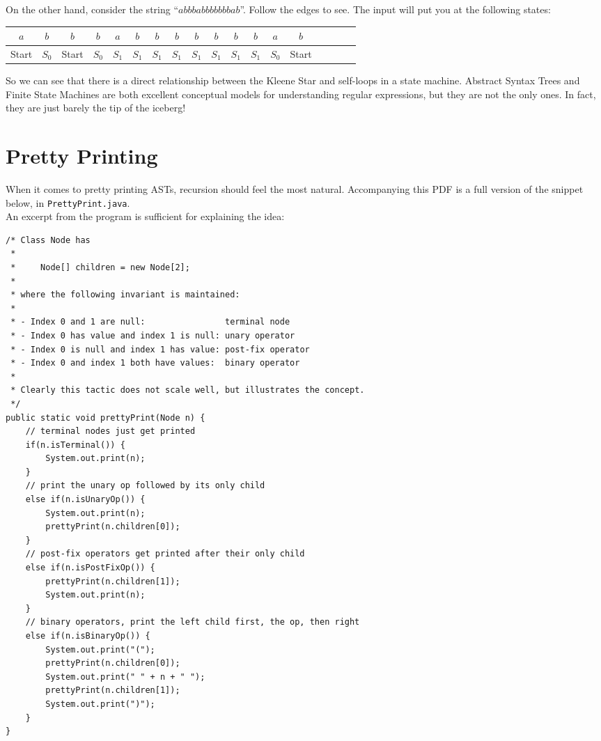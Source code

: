 \documentclass[12pt, leqno]{article} %
\begin{document}
\noindent On the other hand, consider the string ``$abbbabbbbbbbab$''.  Follow the edges to see.  The input will put you at the following states:
\begin{center}
  \begin{tabular}{|c|c|c|c|c|c|c|c|c|c|c|c|c|c|c|c|c|c|}
    \hline
    $a$ & $b$ & $b$ & $b$ & $a$ & $b$ & $b$ & $b$ & $b$ & $b$ & $b$ & $b$ & $a$ & $b$ \\ \hline
    Start & $S_0$ & Start & $S_0$ & $S_1$ & $S_1$ & $S_1$ & $S_1$ & $S_1$ & $S_1$ & $S_1$ & $S_1$ & $S_0$ & Start\\ \hline
  \end{tabular}
\end{center}
So we can see that there is a direct relationship between the Kleene Star and self-loops in a state machine.  Abstract Syntax Trees and Finite State Machines are both excellent conceptual models for understanding regular expressions, but they are not the only ones.  In fact, they are just barely the tip of the iceberg!
%
%
\section{Pretty Printing}
\label{sec:pretty_printing}
When it comes to pretty printing ASTs, recursion should feel the most natural.  Accompanying this PDF is a full version of the snippet below, in \texttt{PrettyPrint.java}.\\

\noindent An excerpt from the program is sufficient for explaining the idea:
\begin{small}
\begin{verbatim}
/* Class Node has
 * 
 *     Node[] children = new Node[2];
 *
 * where the following invariant is maintained:
 *
 * - Index 0 and 1 are null:                terminal node
 * - Index 0 has value and index 1 is null: unary operator
 * - Index 0 is null and index 1 has value: post-fix operator
 * - Index 0 and index 1 both have values:  binary operator
 *
 * Clearly this tactic does not scale well, but illustrates the concept.
 */
public static void prettyPrint(Node n) {
    // terminal nodes just get printed
    if(n.isTerminal()) {
        System.out.print(n);
    }
    // print the unary op followed by its only child
    else if(n.isUnaryOp()) {
        System.out.print(n);
        prettyPrint(n.children[0]);
    }
    // post-fix operators get printed after their only child
    else if(n.isPostFixOp()) {
        prettyPrint(n.children[1]);
        System.out.print(n);
    }
    // binary operators, print the left child first, the op, then right
    else if(n.isBinaryOp()) {
        System.out.print("(");
        prettyPrint(n.children[0]);
        System.out.print(" " + n + " ");
        prettyPrint(n.children[1]);
        System.out.print(")");
    }
}
\end{verbatim}
\end{small}
%
\end{document}
